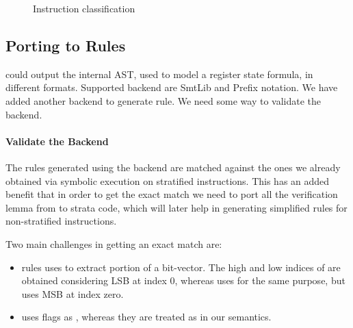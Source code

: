 \begin{figure*}[t]
\centering
{}
\caption{Instruction classification\label{fig:instr_class}}
\end{figure*}

\subsection{Porting to \K Rules}

\Strata could output the internal AST, used to model a register state formula, in different
formats. Supported backend are SmtLib and Prefix notation. We have added another backend 
to generate \K rule. We need some way to validate the backend. 

\paragraph{Validate the Backend}

The \K rules generated using the backend are matched against the ones we already
obtained via symbolic execution on stratified instructions.  This has an added
benefit that in order to get the exact match we need to port all the
verification lemma from \K to strata code, which will later help in generating
simplified \K rules for non-stratified instructions.


Two main challenges in getting an exact match are:
\begin{itemize}

\item  \Strata rules uses \extract to extract portion of a bit-vector. The high
and low indices of \extract are obtained considering LSB at index 0, whereas \K
uses \extractMInt for the same purpose, but uses MSB at index zero.

\item  \Strata uses flags as \bool, whereas they are treated as \bv in our
semantics.

\end{itemize}


